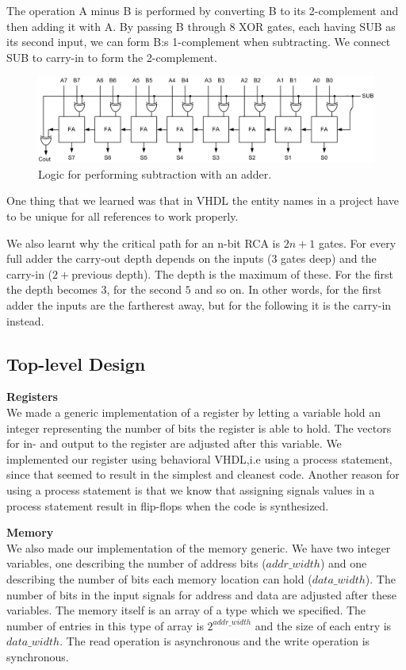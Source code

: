 \documentclass[a4paper,11pt]{article}
\begin{document}
The operation A minus B is performed by converting B to its 2-complement and then adding it with A. By passing B through 8 XOR gates, each having SUB as its second input, we can form B:s 1-complement when subtracting. We connect SUB to carry-in to form the 2-complement.

\begin{figure}[h!]
  \centering
  \includegraphics[width=0.90\linewidth]{subtractionlogic.jpg}
  \caption{Logic for performing subtraction with an adder.}
  \label{fig:etikett}
\end{figure}

One thing that we learned was that in VHDL the entity names in a project have to be unique for all references to work properly. 

We also learnt why the critical path for an n-bit RCA is $2n+1$ gates. For every full adder the carry-out depth depends on the inputs ($3$ gates deep) and the carry-in ($2 + $previous depth). The depth is the maximum of these. For the first the depth becomes $3$, for the second $5$ and so on. In other words, for the first adder the inputs are the fartherest away, but for the following it is the carry-in instead. 

\newpage
\subsection{Top-level Design}
\textbf{Registers}\\
We made a generic implementation of a register by letting a variable hold an integer representing the number of bits the register is able to hold. The vectors for in- and output to the register are adjusted after this variable. We implemented our register using behavioral VHDL,i.e using a process statement, since that seemed to result in the simplest and cleanest code. Another reason for using a process statement is that we know that assigning signals values in a process statement result in flip-flops when the code is synthesized.

\textbf{Memory}\\
We also made our implementation of the memory generic. We have two integer variables, one describing the number of address bits ($addr\_width$) and one describing the number of bits each memory location can hold ($data\_width$). The number of bits in the input signals for address and data are adjusted after these variables. The memory itself is an array of a type which we specified. The number of entries in this type of array is $2^{addr\_width}$ and the size of each entry is $data\_width$. The read operation is asynchronous and the write operation is synchronous.
\end{document}
